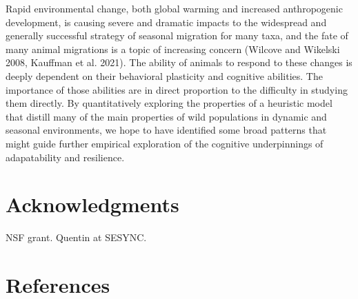 \documentclass[12pt]{article}
\begin{document}
Rapid environmental change, both global warming and increased
anthropogenic development, is causing severe and dramatic impacts to the
widespread and generally successful strategy of seasonal migration for
many taxa, and the fate of many animal migrations is a topic of
increasing concern (Wilcove and Wikelski 2008, Kauffman et al. 2021).
The ability of animals to respond to these changes is deeply dependent
on their behavioral plasticity and cognitive abilities. The importance
of those abilities are in direct proportion to the difficulty in
studying them directly. By quantitatively exploring the properties of a
heuristic model that distill many of the main properties of wild
populations in dynamic and seasonal environments, we hope to have
identified some broad patterns that might guide further empirical
exploration of the cognitive underpinnings of adapatability and
resilience.

\hypertarget{acknowledgments}{%
\section{Acknowledgments}\label{acknowledgments}}

NSF grant. Quentin at SESYNC.

\hypertarget{references}{%
\section*{References}\label{references}}
\end{document}
